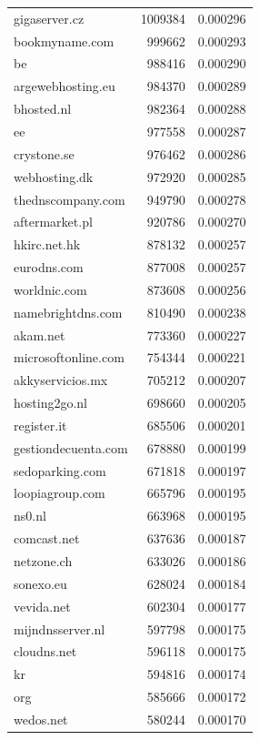 \begin{tabular}{lrr}
gigaserver.cz & 1009384 & 0.000296 \\
bookmyname.com & 999662 & 0.000293 \\
be & 988416 & 0.000290 \\
argewebhosting.eu & 984370 & 0.000289 \\
bhosted.nl & 982364 & 0.000288 \\
ee & 977558 & 0.000287 \\
crystone.se & 976462 & 0.000286 \\
webhosting.dk & 972920 & 0.000285 \\
thednscompany.com & 949790 & 0.000278 \\
aftermarket.pl & 920786 & 0.000270 \\
hkirc.net.hk & 878132 & 0.000257 \\
eurodns.com & 877008 & 0.000257 \\
worldnic.com & 873608 & 0.000256 \\
namebrightdns.com & 810490 & 0.000238 \\
akam.net & 773360 & 0.000227 \\
microsoftonline.com & 754344 & 0.000221 \\
akkyservicios.mx & 705212 & 0.000207 \\
hosting2go.nl & 698660 & 0.000205 \\
register.it & 685506 & 0.000201 \\
gestiondecuenta.com & 678880 & 0.000199 \\
sedoparking.com & 671818 & 0.000197 \\
loopiagroup.com & 665796 & 0.000195 \\
ns0.nl & 663968 & 0.000195 \\
comcast.net & 637636 & 0.000187 \\
netzone.ch & 633026 & 0.000186 \\
sonexo.eu & 628024 & 0.000184 \\
vevida.net & 602304 & 0.000177 \\
mijndnsserver.nl & 597798 & 0.000175 \\
cloudns.net & 596118 & 0.000175 \\
kr & 594816 & 0.000174 \\
org & 585666 & 0.000172 \\
wedos.net & 580244 & 0.000170 \\
\bottomrule
\end{tabular}
